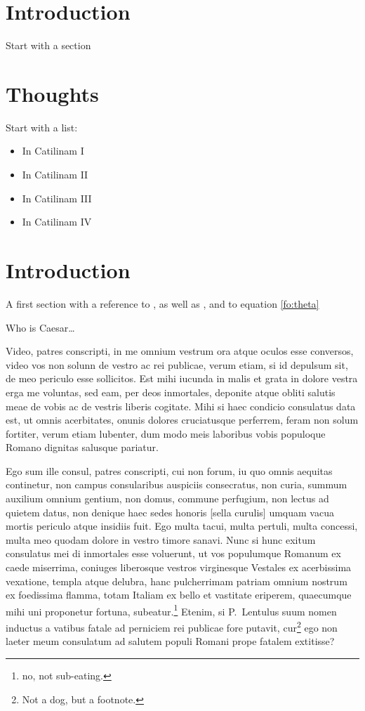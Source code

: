 \documentclass{elsart}
\begin{document}
\section{Introduction}

Start with a section

\section{Thoughts}
Start with a list:
\begin{itemize}
\item In Catilinam I
\item In Catilinam II
\item In Catilinam III
\item In Catilinam IV
\end{itemize}

\section{Introduction}
A first section with a reference to \cite{ref1}, as well as
\cite{L1,M2,M3,M6,M9}, and to equation \ref{fo:theta}

Who is Caesar\ldots

Video, patres conscripti, in me omnium vestrum ora atque oculos esse
conversos, video vos non solunn de vestro ac rei publicae, verum
etiam, si id depulsum sit, de meo periculo esse sollicitos. Est mihi
iucunda in malis et grata in dolore vestra erga me voluntas, sed eam,
per deos inmortales, deponite atque obliti salutis meae de vobis ac de
vestris liberis cogitate. Mihi si haec condicio consulatus data est,
ut omnis acerbitates, onunis dolores cruciatusque perferrem, feram non
solum fortiter, verum etiam lubenter, dum modo meis laboribus vobis
populoque Romano dignitas salusque pariatur. \par Ego sum ille consul,
patres conscripti, cui non forum, iu quo omnis aequitas continetur,
non campus consularibus auspiciis consecratus, non curia, summum
auxilium omnium gentium, non domus, commune perfugium, non lectus ad
quietem datus, non denique haec sedes honoris [sella curulis] umquam
vacua mortis periculo atque insidiis fuit.  Ego multa tacui, multa
pertuli, multa concessi, multa meo quodam dolore in vestro timore
sanavi. Nunc si hunc exitum consulatus mei di inmortales esse
voluerunt, ut vos populumque Romanum ex caede miserrima, coniuges
liberosque vestros virginesque Vestales ex acerbissima vexatione,
templa atque delubra, hanc pulcherrimam patriam omnium nostrum ex
foedissima flamma, totam Italiam ex bello et vastitate eriperem,
quaecumque mihi uni proponetur fortuna, subeatur.\footnote{no, not
  sub-eating.} Etenim, si P.~Lentulus suum nomen inductus a vatibus
fatale ad perniciem rei publicae fore putavit, cur\footnote{Not a dog,
  but a footnote.} ego non laeter meum consulatum ad salutem populi
Romani prope fatalem extitisse?
\end{document}
